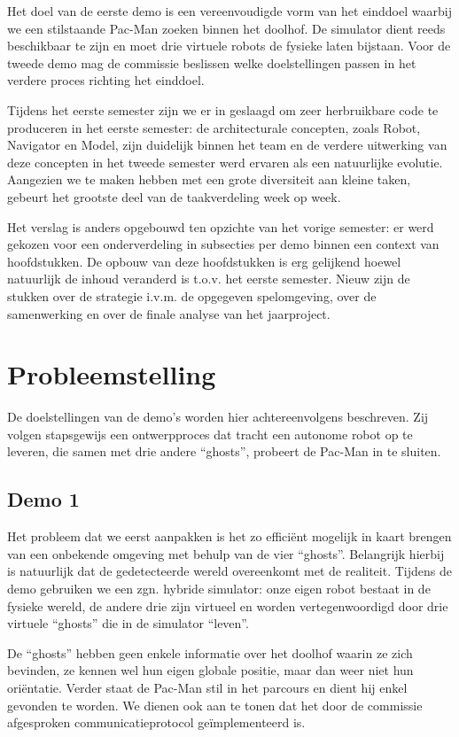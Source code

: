 \documentclass[12pt,a4paper]{report}
\begin{document}
Het doel van de eerste demo is een vereenvoudigde vorm van het einddoel waarbij we een stilstaande Pac-Man zoeken binnen het doolhof. De simulator dient  reeds beschikbaar te zijn en moet drie virtuele robots de fysieke laten bijstaan. Voor de tweede demo mag de commissie beslissen welke doelstellingen passen in het verdere proces richting het einddoel.

Tijdens het eerste semester zijn we er in geslaagd om zeer herbruikbare code te produceren in het eerste semester: de architecturale concepten, zoals Robot, Navigator en Model, zijn duidelijk binnen het team en de verdere uitwerking van deze concepten in het tweede semester werd ervaren als een natuurlijke evolutie. Aangezien we te maken hebben met een grote diversiteit aan kleine taken, gebeurt het grootste deel van de taakverdeling week op week.

Het verslag is anders opgebouwd ten opzichte van het vorige semester: er werd gekozen voor een onderverdeling in subsecties per demo binnen een context van hoofdstukken. De opbouw van deze hoofdstukken is erg gelijkend hoewel natuurlijk de inhoud veranderd is t.o.v. het eerste semester. Nieuw zijn de stukken over de strategie i.v.m. de opgegeven spelomgeving, over de samenwerking en over de finale analyse van het jaarproject.

\chapter{Probleemstelling}

De doelstellingen van de demo's worden hier achtereenvolgens beschreven. Zij volgen stapsgewijs een ontwerpproces dat tracht een autonome robot op te leveren, die samen met drie andere ``ghosts'', probeert de Pac-Man in te sluiten.

\section{Demo 1}

Het probleem dat we eerst aanpakken is het zo effici\"ent mogelijk in kaart brengen van een onbekende omgeving met behulp van de vier ``ghosts''. Belangrijk hierbij is natuurlijk dat de gedetecteerde wereld overeenkomt met de realiteit. Tijdens de demo gebruiken we een zgn. hybride simulator: onze eigen robot bestaat in de fysieke wereld, de andere drie zijn virtueel en worden vertegenwoordigd door drie virtuele ``ghosts'' die in de simulator ``leven''.

De ``ghosts'' hebben geen enkele informatie over het doolhof waarin ze zich bevinden, ze kennen wel hun eigen globale positie, maar dan weer niet hun ori\"entatie. Verder staat de Pac-Man stil in het parcours en dient hij enkel gevonden te worden. We dienen ook aan te tonen dat het door de commissie afgesproken communicatieprotocol ge\"implementeerd is.
\end{document}
